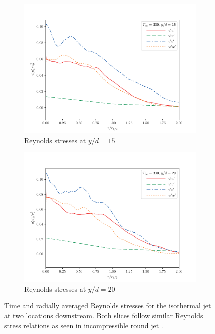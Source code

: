 \begin{figure}[hbtp!]
\begin{center}
\begin{subfigure}{0.45\textwidth}
	\includegraphics[scale=.45]{figures/Plots/radial/slices_5/same_ambient/Rey_Stress_0_15.pdf}
	\caption{Reynolds stresses at $y/d=15$} \label{330_rey_15}
\end{subfigure}
\begin{subfigure}{0.45\textwidth}
	\includegraphics[scale=.45]{figures/Plots/radial/slices_5/same_ambient/Rey_Stress_0_2.pdf}
	\caption{Reynolds stresses at $y/d=20$} \label{330_rey_20}
\end{subfigure}
\caption{Time and radially averaged Reynolds stresses for the isothermal jet at two locations downstream. Both slices follow similar Reynolds stress relations as seen in incompressible round jet \cite{Pope}.}
\label{330_reynolds_features}
\end{center}
\end{figure}


